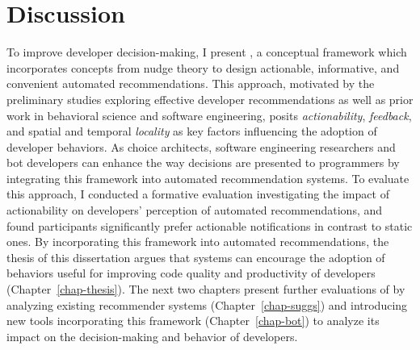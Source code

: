 

\section{Discussion}

To improve developer decision-making, I present \framework, a conceptual framework which incorporates concepts from nudge theory to design actionable, informative, and convenient automated recommendations. This approach, motivated by the preliminary studies exploring effective developer recommendations as well as prior work in behavioral science and software engineering, posits \textit{actionability}, \textit{feedback}, and spatial and temporal \textit{locality} as key factors influencing the adoption of developer behaviors. As choice architects, software engineering researchers and bot developers can enhance the way decisions are presented to programmers by integrating this framework into automated recommendation systems. To evaluate this approach, I conducted a formative evaluation investigating the impact of actionability on developers' perception of automated recommendations, and found participants significantly prefer actionable notifications in contrast to static ones. By incorporating this framework into automated recommendations, the thesis of this dissertation argues that systems can encourage the adoption of behaviors useful for improving code quality and productivity of developers (Chapter~\ref{chap-thesis}). The next two chapters present further evaluations of \framework by analyzing existing recommender systems (Chapter~\ref{chap-suggs}) and introducing new tools incorporating this framework (Chapter~\ref{chap-bot}) to analyze its impact on the decision-making and behavior of developers.

